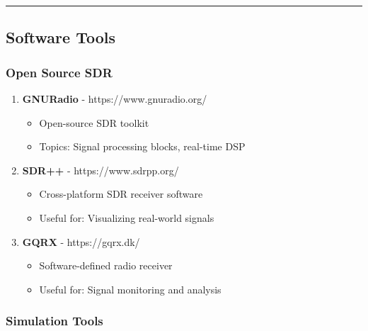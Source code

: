 \begin{center}\rule{0.5\linewidth}{0.5pt}\end{center}

\subsection{\texorpdfstring{ Software
Tools}{ Software Tools}}\label{software-tools}

\subsubsection{Open Source SDR}\label{open-source-sdr}

\begin{enumerate}
\def\labelenumi{\arabic{enumi}.}
\setcounter{enumi}{48}
\tightlist
\item
  \textbf{GNURadio} - https://www.gnuradio.org/

  \begin{itemize}
  \tightlist
  \item
    Open-source SDR toolkit
  \item
    Topics: Signal processing blocks, real-time DSP
  \end{itemize}
\item
  \textbf{SDR++} - https://www.sdrpp.org/

  \begin{itemize}
  \tightlist
  \item
    Cross-platform SDR receiver software
  \item
    Useful for: Visualizing real-world signals
  \end{itemize}
\item
  \textbf{GQRX} - https://gqrx.dk/

  \begin{itemize}
  \tightlist
  \item
    Software-defined radio receiver
  \item
    Useful for: Signal monitoring and analysis
  \end{itemize}
\end{enumerate}

\subsubsection{Simulation Tools}\label{simulation-tools}

